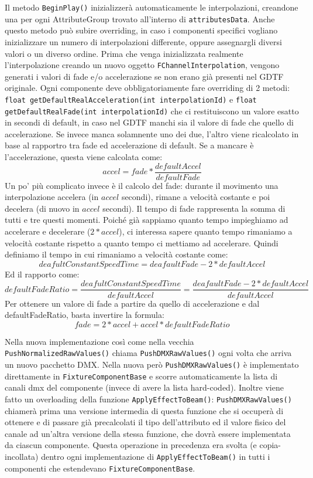 \documentclass[main.tex]{subfiles}
\begin{document}
Il metodo \lstinline{BeginPlay()} inizializzerà automaticamente le interpolazioni, creandone una per ogni AttributeGroup trovato all'interno di \lstinline{attributesData}. Anche questo metodo può subire overriding, in caso i componenti specifici vogliano inizializzare un numero di interpolazioni differente, oppure assegnargli diversi valori o un diverso ordine. Prima che venga inizializzata realmente l'interpolazione creando un nuovo oggetto \lstinline{FChannelInterpolation}, vengono generati i valori di fade e/o accelerazione se non erano già presenti nel GDTF originale. Ogni componente deve obbligatoriamente fare overriding di 2 metodi: \lstinline{float getDefaultRealAcceleration(int interpolationId)} e \lstinline{float getDefaultRealFade(int interpolationId)} che ci restituiscono un valore esatto in secondi di default, in caso nel GDTF manchi sia il valore di fade che quello di accelerazione. Se invece manca solamnente uno dei due, l'altro viene ricalcolato in base al rapportro tra fade ed accelerazione di default. Se a mancare è l'accelerazione, questa viene calcolata come:
\[accel = fade * \frac{defaultAccel}{defaultFade}\]
Un po' più complicato invece è il calcolo del fade: durante il movimento una interpolazione accelera (in $accel$ secondi), rimane a velocità costante e poi decelera (di nuovo in $accel$ secondi). Il tempo di fade rappresenta la somma di tutti e tre questi momenti. Poiché già sappiamo quanto tempo impieghiamo ad accelerare e decelerare ($2 * accel$), ci interessa sapere quanto tempo rimaniamo a velocità costante rispetto a quanto tempo ci mettiamo ad accelerare. Quindi definiamo il tempo in cui rimaniamo a velocità costante come:
\[deafultConstantSpeedTime = deafaultFade - 2 * defaultAccel\] 
Ed il rapporto come:
\[defaultFadeRatio = \frac{deafultConstantSpeedTime}{defaultAccel} = \frac{deafaultFade - 2 * defaultAccel}{defaultAccel}\]
Per ottenere un valore di fade a partire da quello di accelerazione e dal defaultFadeRatio, basta invertire la formula:
\[fade = 2 * accel + accel * defaultFadeRatio\]

Nella nuova implementazione così come nella vecchia \lstinline{PushNormalizedRawValues()} chiama \lstinline{PushDMXRawValues()} ogni volta che arriva un nuovo pacchetto DMX. Nella nuova però \lstinline{PushDMXRawValues()} è implementato direttamente in \lstinline{FixtureComponentBase} e scorre automaticamente la lista di canali dmx del componente (invece di avere la lista hard-coded). Inoltre viene fatto un overloading della funzione \lstinline{ApplyEffectToBeam()}: \lstinline{PushDMXRawValues()} chiamerà prima una versione intermedia di questa funzione che si occuperà di ottenere e di passare già precalcolati il tipo dell'attributo ed il valore fisico del canale ad un'altra versione della stessa funzione, che dovrà essere implementata da ciascun componente. Questa operazione in precedenza era svolta (e copia-incollata) dentro ogni implementazione di \lstinline{ApplyEffectToBeam()} in tutti i componenti che estendevano \lstinline{FixtureComponentBase}.
\end{document}
